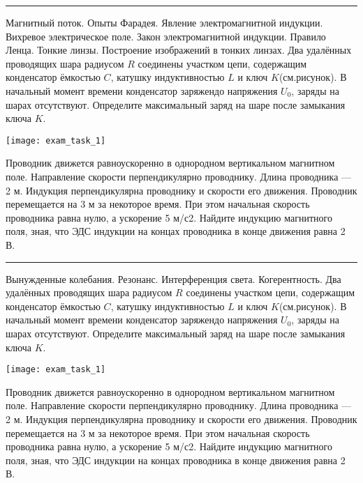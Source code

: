 \documentclass[a5paper, landscape]{exam}
\begin{document}
\vspace{\fill}
\newpage

\rule{1\textwidth}{0.4pt}
\begin{questions}
\question Магнитный поток. Опыты Фарадея. Явление электромагнитной индукции. Вихревое электрическое поле. Закон электромагнитной индукции. Правило Ленца.
\question Тонкие линзы. Построение изображений в тонких линзах.
\question Два удалённых проводящих шара радиусом $R$ соединены участком цепи, содержащим конденсатор ёмкостью $C$, катушку индуктивностью $L$ и ключ $K$(см.рисунок). В начальный момент времени конденсатор заряжендо напряжения $U_0$, заряды на шарах отсутствуют. Определите максимальный заряд на шаре после замыкания ключа $K$.

\texttt{[image: exam\_task\_1]}


\question Проводник движется равноускоренно в однородном вертикальном магнитном поле. Направление скорости перпендикулярно проводнику. Длина проводника — 2 м. Индукция перпендикулярна проводнику и скорости его движения. Проводник перемещается на 3 м за некоторое время. При этом начальная скорость проводника равна нулю, а ускорение 5 м/с2. Найдите индукцию магнитного поля, зная, что ЭДС индукции на концах проводника в конце движения равна 2 В.
\end{questions}


\newpage

\rule{1\textwidth}{0.4pt}
\begin{questions}
\question Вынужденные колебания. Резонанс.
\question Интерференция света. Когерентность. 
\question Два удалённых проводящих шара радиусом $R$ соединены участком цепи, содержащим конденсатор ёмкостью $C$, катушку индуктивностью $L$ и ключ $K$(см.рисунок). В начальный момент времени конденсатор заряжендо напряжения $U_0$, заряды на шарах отсутствуют. Определите максимальный заряд на шаре после замыкания ключа $K$.

\texttt{[image: exam\_task\_1]}


\question Проводник движется равноускоренно в однородном вертикальном магнитном поле. Направление скорости перпендикулярно проводнику. Длина проводника — 2 м. Индукция перпендикулярна проводнику и скорости его движения. Проводник перемещается на 3 м за некоторое время. При этом начальная скорость проводника равна нулю, а ускорение 5 м/с2. Найдите индукцию магнитного поля, зная, что ЭДС индукции на концах проводника в конце движения равна 2 В.
\end{questions}
\end{document}
